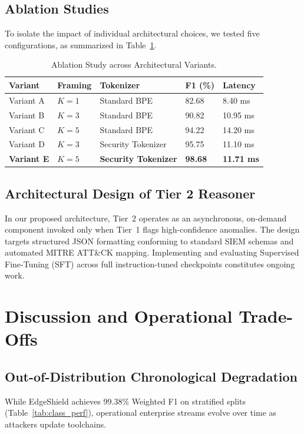\documentclass[10pt,journal,compsoc]{IEEEtran}
\begin{document}
\subsection{Ablation Studies}
To isolate the impact of individual architectural choices, we tested five configurations, as summarized in Table~\ref{tab:ablation}.

\begin{table}[htbp]
\centering
\caption{Ablation Study across Architectural Variants.}
\label{tab:ablation}
\begin{tabular}{lllll}
\toprule
\textbf{Variant} & \textbf{Framing} & \textbf{Tokenizer} & \textbf{F1 (\%)} & \textbf{Latency} \\
\midrule
Variant A & $K=1$ & Standard BPE & 82.68 & 8.40 ms \\
Variant B & $K=3$ & Standard BPE & 90.82 & 10.95 ms \\
Variant C & $K=5$ & Standard BPE & 94.22 & 14.20 ms \\
Variant D & $K=3$ & Security Tokenizer & 95.75 & 11.10 ms \\
\textbf{Variant E} & \textbf{$K=5$} & \textbf{Security Tokenizer} & \textbf{98.68} & \textbf{11.71 ms} \\
\bottomrule
\end{tabular}
\end{table}

\subsection{Architectural Design of Tier 2 Reasoner}
In our proposed architecture, Tier~2 operates as an asynchronous, on-demand component invoked only when Tier~1 flags high-confidence anomalies. The design targets structured JSON formatting conforming to standard SIEM schemas and automated MITRE ATT\&CK mapping. Implementing and evaluating Supervised Fine-Tuning (SFT) across full instruction-tuned checkpoints constitutes ongoing work.

\section{Discussion and Operational Trade-Offs}
\label{sec:discussion}
\subsection{Out-of-Distribution Chronological Degradation}
While EdgeShield achieves 99.38\% Weighted F1 on stratified splits (Table~\ref{tab:class_perf}), operational enterprise streams evolve over time as attackers update toolchains. 
\end{document}
